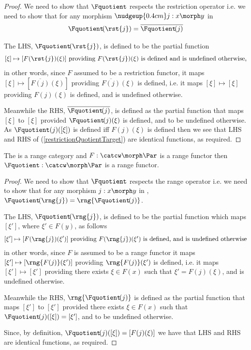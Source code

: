 \begin{proof}
We need to show that  $\Fquotient$ respects the restriction operator
i.e. we need to show that for any morphism $\nudgeup{0.4cm}j:x \morph y$ in \catcw
\begin{equation}
\label{restrictionQuotientTarget}
\Fquotient\!(\rst{j})= \overline{\Fquotient\!(j)}
\end{equation}

The LHS, $\Fquotient\!(\rst{j})$, is defined to  be the partial function
\[ [\xi] \mapsto [F(\rst{j})(\xi)] 
        \mbox{ providing $F(\rst{j})(\xi)$ is defined and is undefined otherwise,}
\]
in other words, since  $F$ assumed to be a restriction functor, it maps
$[\xi] \mapsto [\overline{F(j)}(\xi)]$ 
    providing $\overline{F(j)}(\xi)$ is defined, 
i.e. it maps
$[\xi] \mapsto [\xi]$ providing $F(j)(\xi)$ is defined, and is undefined otherwise.

Meanwhile the RHS, $\overline{\Fquotient\!(j)}$,
is defined as the partial function that 
maps $[\xi]$  to $[\xi]$  provided  $\Fquotient\!(j)(\xi)$ is defined, and to be undefined otherwise. As 
$\Fquotient(j)([\xi])$ is defined iff $F(j)(\xi)$ is defined then
we see  that LHS and RHS of (\ref{restrictionQuotientTarget}) are identical functions, as required.
\end{proof}

\begin{lemma}
\label{rangefunctorquotient}
The \catcw is a range category and $F: \catcw \morph \Par$ is a range functor 
then $\Fquotient:\catcw \morph \Par$ is a range functor.
\end{lemma}
\begin{proof} 
We need to show that  $\Fquotient$ respects the range operator
i.e. we need to show that for any morphism $j:x \morph y$ in \catcw, 
 $\Fquotient\!(\rng{j})= \rng{\Fquotient\!(j)}$.

The LHS, $\Fquotient\!(\rng{j})$, is defined to  be 
the partial function which maps $[\xi']$, where $\xi' \in F(y)$, as follows
\[
[\xi'] \mapsto [F(\rng{j})(\xi')] \mbox{ providing $F(\rng{j})(\xi')$ is defined, and is undefined otherwise}
\]
in other words, since  $F$ is assumed to be a range functor it maps
$[\xi'] \mapsto [\rng{F(j)}(\xi')]$  providing $\rng{F(j)}(\xi')$ is defined,
i.e. it maps
$[\xi'] \mapsto [\xi']$ providing there exists $\xi \in F(x)$ such that 
$\xi'=F(j)(\xi)$, and is undefined otherwise.

Meanwhile the RHS, $\rng{\Fquotient\!(j)}$  
is defined as the partial function that 
maps $[\xi']$  to $[\xi']$  provided  there exists $\xi \in F(x)$ such that
$\Fquotient\!(j)([\xi])=[\xi']$, and to be undefined otherwise.

Since, by definition, $\Fquotient\!(j)([\xi])= [F(j)(\xi)]$   
we have  that LHS and RHS are identical functions, as required.
\end{proof}
